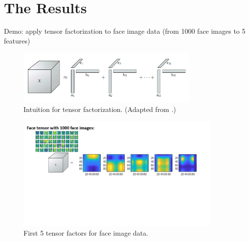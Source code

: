 \documentclass[xcolor={dvipsnames,svgnames}]{beamer}
\begin{document}
\section{The Results}
\begin{frame}{Demo: apply tensor factorization to face image data (from 1000 face images to 5 features)}
\begin{figure}[H]
        \centering
            \includegraphics[width=0.8\textwidth]{figures-tensor/cp-decomp.png}
            \caption{Intuition for tensor factorization. (Adapted from \cite{Kol2009}.)}
        \end{figure} 
    \begin{figure}[H]
        \centering
            \includegraphics[width=0.9\textwidth]{Slide2.jpg}
            \caption{First 5 tensor factors for face image data.}
        \end{figure} 
\end{frame}
\end{document}
